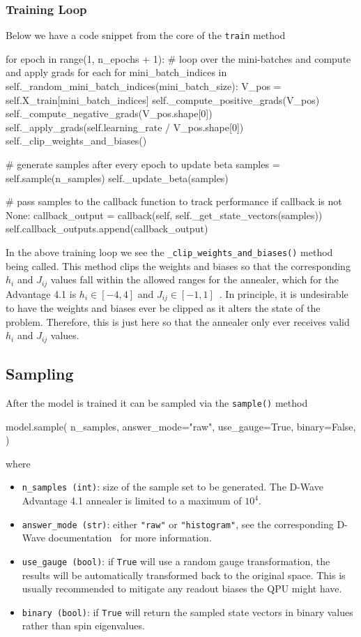 \subsubsection{Training Loop}
Below we have a code snippet from the core of the \texttt{train} method
\begin{python}[breaklines=true]
for epoch in range(1, n_epochs + 1):
    # loop over the mini-batches and compute and apply grads for each
    for mini_batch_indices in self._random_mini_batch_indices(mini_batch_size):
        V_pos = self.X_train[mini_batch_indices]
        self._compute_positive_grads(V_pos)
        self._compute_negative_grads(V_pos.shape[0])
        self._apply_grads(self.learning_rate / V_pos.shape[0])
        self._clip_weights_and_biases()

    # generate samples after every epoch to update beta
    samples = self.sample(n_samples)
    self._update_beta(samples)

    # pass samples to the callback function to track performance
    if callback is not None:
        callback_output = callback(self, self._get_state_vectors(samples))
        self.callback_outputs.append(callback_output)
\end{python}
In the above training loop we see the \texttt{\_clip\_weights\_and\_biases()} method being called.
This method clips the weights and biases so that the corresponding \( h_i \) and \( J_{ij} \) values fall within the allowed ranges for the annealer, which for the Advantage 4.1 is \( h_i \in [-4, 4] \) and \( J_{ij} \in [-1, 1] \)~\cite{dwave_solver_properties}.
In principle, it is undesirable to have the weights and biases ever be clipped as it alters the state of the problem.
Therefore, this is just here so that the annealer only ever receives valid \( h_i \) and \( J_{ij} \) values.

\subsection{Sampling}
After the model is trained it can be sampled via the \texttt{sample()} method
\begin{python}
model.sample(
    n_samples,
    answer_mode="raw",
    use_gauge=True,
    binary=False,
)
\end{python}
where
\begin{itemize}
    \item \texttt{n\_samples (int)}: size of the sample set to be generated. The D-Wave Advantage 4.1 annealer is limited to a maximum of \( 10^4 \).
    \item \texttt{answer\_mode (str)}: either \texttt{"raw"} or \texttt{"histogram"}, see the corresponding D-Wave documentation~\cite{dwave_solver_parameters} for more information.
    \item \texttt{use\_gauge (bool)}: if \texttt{True} will use a random gauge transformation, the results will be automatically transformed back to the original space. This is usually recommended to mitigate any readout biases the QPU might have.
    \item \texttt{binary (bool)}: if \texttt{True} will return the sampled state vectors in binary values rather than spin eigenvalues.
\end{itemize}

